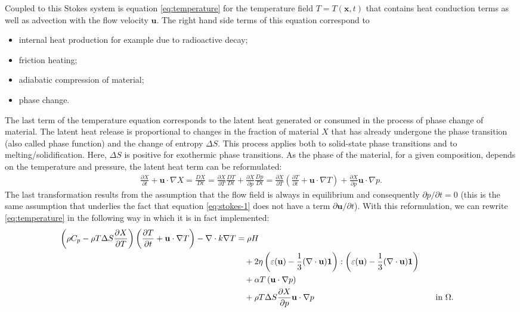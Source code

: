 \documentclass{article}
\begin{document}
Coupled to this Stokes system is equation \eqref{eq:temperature} for the
temperature field $T=T(\mathbf x,t)$ that contains heat conduction terms as
well as advection with the flow velocity $\mathbf u$. The right hand side
terms of this equation correspond to
\begin{itemize}
\item internal heat production for example due to radioactive
  decay;
\item friction heating;
\item adiabatic compression of material;
\item phase change.
\end{itemize}
The last term of the temperature equation corresponds to
the latent heat generated or consumed in the process of phase change of material. The latent heat release
is proportional to changes in the fraction of material $X$ that has already
undergone the phase transition (also called phase function) and the change
of entropy $\Delta S$. This process applies both
to solid-state phase transitions and to melting/solidification.
Here, $\Delta S$ is positive for exothermic phase
transitions. As the phase of the material, for a given composition, depends
on the temperature and pressure, the latent heat term can be reformulated:
\begin{gather*}
\frac{\partial X}{\partial t} + \mathbf u\cdot\nabla X
=
\frac{DX}{Dt} 
= 
\frac{\partial X}{\partial T} \frac{DT}{Dt}
 + \frac{\partial X}{\partial p} \frac{Dp}{Dt}
= 
\frac{\partial X}{\partial T} 
\left(\frac{\partial T}{\partial t} + \mathbf u\cdot\nabla T
\right)
 + \frac{\partial X}{\partial p} \mathbf u\cdot\nabla p.
\end{gather*}
The last transformation results from the assumption that the flow field is
always in equilibrium and consequently $\partial p/\partial t=0$ (this is the
same assumption that underlies the fact that equation \eqref{eq:stokes-1}
does not have a term $\partial \mathbf u / \partial t$). With this
reformulation, we can rewrite \eqref{eq:temperature} in the following way in
which it is in fact implemented:
\begin{align}
  \label{eq:temperature-reformulated}
  \left(\rho C_p - \rho T \Delta S \frac{\partial X}{\partial T}\right) 
  \left(\frac{\partial T}{\partial t} + \mathbf u\cdot\nabla
  T\right) - \nabla\cdot k\nabla T
  &=
  \rho H
  \notag
  \\
  &\quad
  +
  2\eta
  \left(\varepsilon(\mathbf u) - \frac{1}{3}(\nabla \cdot \mathbf u)\mathbf 1\right)
  :
  \left(\varepsilon(\mathbf u) - \frac{1}{3}(\nabla \cdot \mathbf u)\mathbf 1\right)
  \\
  &\quad
  +\alpha T \left( \mathbf u \cdot \nabla p \right)
  \notag
  \\
  &\quad
  + \rho T \Delta S \frac{\partial X}{\partial p} \mathbf u\cdot\nabla p
  & \quad & \textrm{in $\Omega$}.
  \notag
\end{align}
\end{document}
